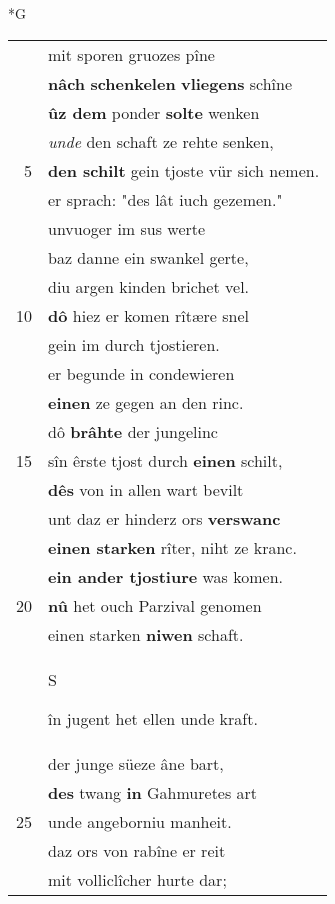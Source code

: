 \documentclass[8pt,a4paper,notitlepage]{article}
\begin{document}
\begin{table}[ht]
\begin{minipage}[t]{0.5\linewidth}
\small
\begin{center}*G
\end{center}
\begin{tabular}{rl}
 & mit sporen gruozes pîne\\ 
 & \textbf{nâch} \textbf{schenkelen} \textbf{vliegens} schîne\\ 
 & \textbf{ûz dem} ponder \textbf{solte} wenken\\ 
 & \textit{unde} den schaft ze rehte senken,\\ 
5 & \textbf{den schilt} gein tjoste vür sich nemen.\\ 
 & er sprach: "des lât iuch gezemen."\\ 
 & unvuoger im sus werte\\ 
 & baz danne ein swankel gerte,\\ 
 & diu argen kinden brichet vel.\\ 
10 & \textbf{dô} hiez er komen rîtære snel\\ 
 & gein im durch tjostieren.\\ 
 & er begunde in condewieren\\ 
 & \textbf{einen} ze gegen an den rinc.\\ 
 & dô \textbf{brâhte} der jungelinc\\ 
15 & sîn êrste tjost durch \textbf{einen} schilt,\\ 
 & \textbf{dês} von in allen wart bevilt\\ 
 & unt daz er hinderz ors \textbf{verswanc}\\ 
 & \textbf{einen starken} rîter, niht ze kranc.\\ 
 & \textbf{ein ander tjostiure} was komen.\\ 
20 & \textbf{nû} het ouch Parzival genomen\\ 
 & einen starken \textbf{niwen} schaft.\\ 
 & \begin{large}S\end{large}în jugent het ellen unde kraft.\\ 
 & der junge süeze âne bart,\\ 
 & \textbf{des} twang \textbf{in} Gahmuretes art\\ 
25 & unde angeborniu manheit.\\ 
 & daz ors von rabîne er reit\\ 
 & mit volliclîcher hurte dar;\\ 

\end{tabular}
\end{minipage}
\end{table}
\end{document}
